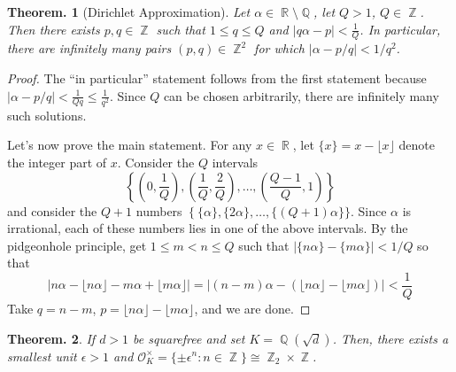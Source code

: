 \documentclass[11pt, a4paper]{memoir}
\DeclareMathOperator{\Q}{{\mathbb{Q}}}
\DeclareMathOperator{\Z}{{\mathbb{Z}}}
\DeclareMathOperator{\R}{{\mathbb{R}}}
\theoremstyle{change}
\newtheorem{theorem}{Theorem.}[section]
\theoremstyle{plain}
\theoremstyle{nonumberplain}
\newtheorem{proof}{Proof}
\begin{document}
\begin{theorem}[Dirichlet Approximation]
    Let $\alpha\in\R\setminus\Q$, let $Q>1$, $Q\in\Z$.
    Then there exists $p,q\in\Z$ such that $1\leq q\leq Q$ and $|q\alpha-p|<\frac{1}{Q}$.
    In particular, there are infinitely many pairs $(p,q)\in\Z^2$ for which $|\alpha-p/q|<1/q^2$.
\end{theorem}
\begin{proof}
    The ``in particular'' statement follows from the first statement because $|\alpha-p/q|<\frac{1}{Qq}\leq\frac{1}{q^2}$.
    Since $Q$ can be chosen arbitrarily, there are infinitely many such solutions.

    Let's now prove the main statement.
    For any $x\in\R$, let $\{x\}=x-\lfloor x\rfloor$ denote the integer part of $x$.
    Consider the $Q$ intervals
    \begin{equation*}
        \left\{\left(0,\frac{1}{Q}\right),\left(\frac{1}{Q},\frac{2}{Q}\right),\ldots,\left(\frac{Q-1}{Q},1\right)\right\}
    \end{equation*}
    and consider the $Q+1$ numbers $\left\{\{\alpha\},\{2\alpha\},\ldots,\{(Q+1)\alpha\}\}$.
    Since $\alpha$ is irrational, each of these numbers lies in one of the above intervals.
    By the pidgeonhole principle, get $1\leq m<n\leq Q$ such that $|\{n\alpha\}-\{m\alpha\}|<1/Q$ so that
    \begin{equation*}
        \left\lvert n\alpha-\lfloor n\alpha\rfloor-m\alpha+\lfloor m\alpha\rfloor\right\rvert=\left\lvert(n-m)\alpha-(\lfloor n\alpha\rfloor-\lfloor m\alpha\rfloor)\right\rvert<\frac{1}{Q}
    \end{equation*}
    Take $q=n-m$, $p=\lfloor n\alpha\rfloor-\lfloor m\alpha\rfloor$, and we are done.
\end{proof}
\begin{theorem}
    If $d>1$ be squarefree and set $K=\Q(\sqrt{d})$.
    Then, there exists a smallest unit $\epsilon>1$ and $\mathcal{O}_K^\times=\{\pm\epsilon^n:n\in\Z\}\cong \Z_2\times\Z$.
\end{theorem}
\end{document}
